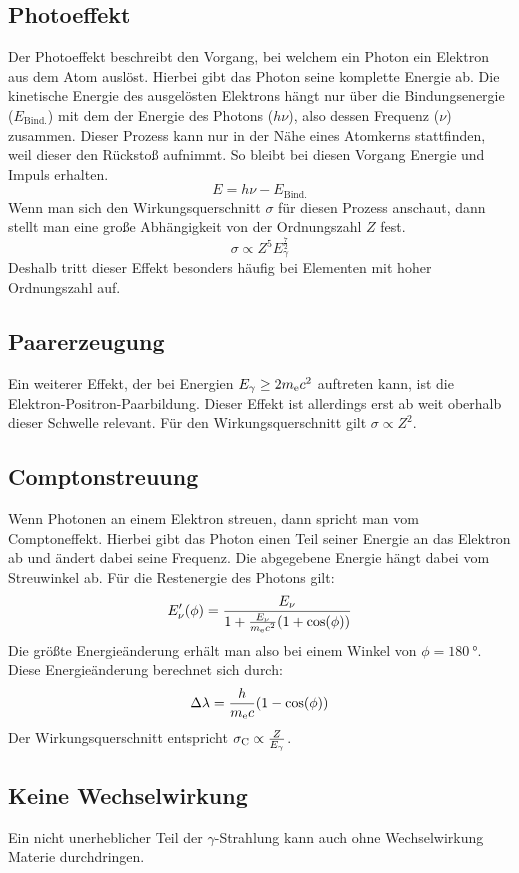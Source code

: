 \documentclass[11pt, ngerman, fleqn, DIV=15, headinclude, BCOR=2cm]{scrreprt}
\begin{document}
\subsection{Photoeffekt}
Der Photoeffekt beschreibt den Vorgang, bei welchem ein Photon ein Elektron aus
dem Atom auslöst.
Hierbei gibt das Photon seine komplette Energie ab.
Die kinetische Energie des ausgelösten Elektrons hängt nur über die
Bindungsenergie ($E_\text{Bind.}$) mit dem der Energie des Photons ($h\nu$),
also dessen Frequenz ($\nu$) zusammen.
Dieser Prozess kann nur in der Nähe eines Atomkerns stattfinden, weil dieser
den Rückstoß aufnimmt.
So bleibt bei diesen Vorgang Energie und Impuls erhalten. 
\[ 
    E = h\nu - E_\text{Bind.}
\]
Wenn man sich den Wirkungsquerschnitt $\sigma$ für diesen Prozess anschaut,
dann stellt man eine große Abhängigkeit von der Ordnungszahl $Z$ fest.
\[
    \sigma \propto Z^5 E_\gamma^{\frac 72}
\]
Deshalb tritt dieser Effekt besonders häufig bei Elementen mit hoher Ordnungszahl
auf.

 \subsection{Paarerzeugung}

Ein weiterer Effekt, der bei Energien $E_\gamma \ge 2m_\text ec^2$ auftreten
kann, ist die Elektron-Positron-Paarbildung.
Dieser Effekt ist allerdings erst ab weit oberhalb dieser Schwelle relevant.
Für den Wirkungsquerschnitt gilt $\sigma \propto Z^2$.


\subsection{Comptonstreuung}
Wenn Photonen an einem Elektron streuen, dann spricht man vom Comptoneffekt. 
Hierbei gibt das Photon einen Teil seiner Energie an das Elektron ab und ändert dabei
seine Frequenz.%
Die abgegebene Energie hängt dabei vom Streuwinkel ab.
Für die Restenergie des Photons gilt:
\[
    E_\nu'(\phi) = \frac{E_\nu}{1+\frac{E_\nu}{m_\text ec^2}(1+\cos(\phi))}
\]
Die größte Energieänderung erhält man also bei einem Winkel von
$\phi=\SI{180}{\degree}$.
Diese Energieänderung berechnet sich durch:
\[
    \Delta\lambda = \frac{h}{m_\text ec}(1-\cos(\phi))
\]
Der Wirkungsquerschnitt entspricht $\sigma_\text C \propto \frac{Z}{E_\gamma}$.

\subsection{Keine Wechselwirkung}
Ein nicht unerheblicher Teil der $\gamma$-Strahlung kann auch ohne Wechselwirkung
Materie durchdringen.
\end{document}
